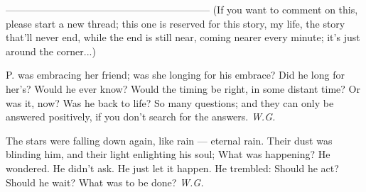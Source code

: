 --------------------------------------------------------------
(If you want to comment on this, please start a new thread; this one is reserved for this story, my life, the story that'll never end, while the end is still near, coming nearer every minute; it's just around the corner...)

P. was embracing her friend; 
was she longing for his embrace? 
Did he long for her's? 
Would he ever know? 
Would the timing be right, 
in some distant time? 
Or was it, now? 
Was he back to life? 
So many questions; 
and they can only be answered positively, 
if you don't search for the answers. 
\emph{W.G.}

The stars were falling down again, 
like rain --- 
eternal rain. 
Their dust was blinding him, 
and their light enlighting his soul; 
What was happening? 
He wondered. 
He didn't ask. 
He just let it happen. 
He trembled: 
Should he act? 
Should he wait? 
What was to be done? 
\emph{W.G.}
